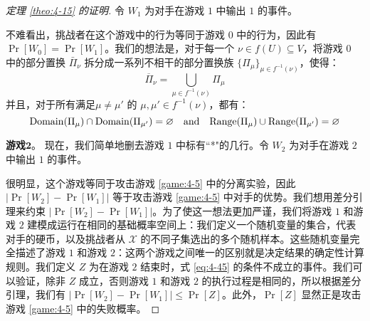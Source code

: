 \begin{proof}[定理 \ref{theo:4-15} 的证明]
\vspace{5pt}

令 $W_1$ 为对手在游戏 $1$ 中输出 $1$ 的事件。

不难看出，挑战者在这个游戏中的行为等同于游戏 $0$ 中的行为，因此有 $\Pr[W_0]=\Pr[W_1]$。我们的想法是，对于每一个 $\nu\in f(U)\subseteq V$，将游戏 $0$ 中的部分置换 $\bar\Pi_\nu$ 拆分成一系列不相干的部分置换族 $\{\Pi_\mu\}_{\mu\in f^{-1}(\nu)}$，使得：
\[
\overline\Pi_\nu=\bigcup_{\mu\in f^{-1}(\nu)}\Pi_\mu
\]
并且，对于所有满足$\mu\neq\mu'$ 的 $\mu,\mu'\in f^{-1}(\nu)$，都有：
\begin{equation}\label{eq:4-45}
{\rm Domain}(\Pi_\mu)\cap{\rm Domain}(\Pi_{\mu'})=\varnothing
\quad\text{and}\quad
{\rm Range}(\Pi_\mu)\cup{\rm Range}(\Pi_{\mu'})=\varnothing
\end{equation}

\vspace{5pt}

\noindent\textbf{游戏$\mathbf{2}$}。
现在，我们简单地删去游戏 $1$ 中标有``*"的几行。令 $W_2$ 为对手在游戏 $2$ 中输出 $1$ 的事件。

很明显，这个游戏等同于攻击游戏 \ref{game:4-5} 中的分离实验，因此 $|\Pr[W_2]-\Pr[W_1]|$ 等于攻击游戏 \ref{game:4-5} 中对手的优势。我们想用差分引理来约束 $|\Pr[W_2]-\Pr[W_1]|$。为了使这一想法更加严谨，我们将游戏 $1$ 和游戏 $2$ 建模成运行在相同的基础概率空间上：我们定义一个随机变量的集合，代表对手的硬币，以及挑战者从 $\mathcal{X}$ 的不同子集选出的多个随机样本。这些随机变量完全描述了游戏 $1$ 和游戏 $2$：这两个游戏之间唯一的区别就是决定结果的确定性计算规则。我们定义 $Z$ 为在游戏 $2$ 结束时，式 \ref{eq:4-45} 的条件不成立的事件。我们可以验证，除非 $Z$ 成立，否则游戏 $1$ 和游戏 $2$ 的执行过程是相同的，所以根据差分引理，我们有 $|\Pr[W_2]-\Pr[W_1]|\leq\Pr[Z]$。此外，$\Pr[Z]$ 显然正是攻击游戏 \ref{game:4-5} 中的失败概率。
\end{proof}